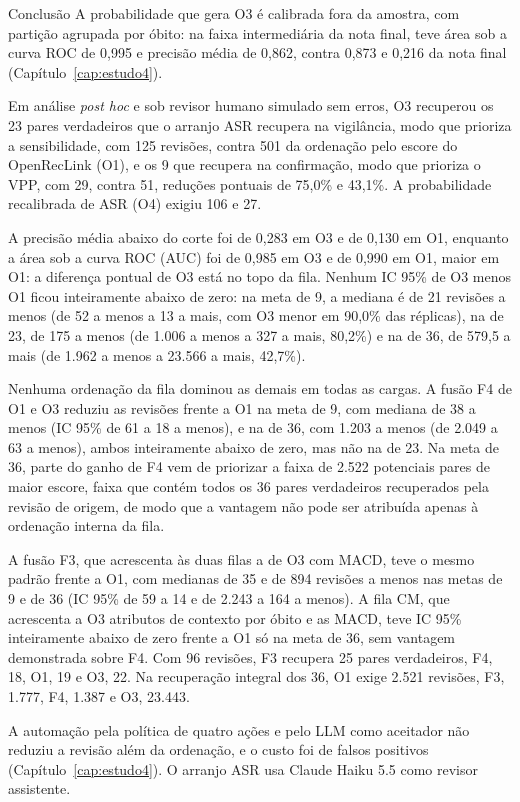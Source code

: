 \begin{chapter}{Conclusão}
A probabilidade que gera O3 é calibrada fora da amostra, com partição agrupada por óbito: na faixa intermediária da nota final, teve área sob a curva ROC de 0,995 e precisão média de 0,862, contra 0,873 e 0,216 da nota final (Capítulo~\ref{cap:estudo4}).

Em análise \textit{post hoc} e sob revisor humano simulado sem erros, O3 recuperou os 23 pares verdadeiros que o arranjo ASR recupera na vigilância, modo que prioriza a sensibilidade, com 125 revisões, contra 501 da ordenação pelo escore do OpenRecLink (O1), e os 9 que recupera na confirmação, modo que prioriza o VPP, com 29, contra 51, reduções pontuais de 75,0\% e 43,1\%. A probabilidade recalibrada de ASR (O4) exigiu 106 e 27.

A precisão média abaixo do corte foi de 0,283 em O3 e de 0,130 em O1, enquanto a área sob a curva ROC (AUC) foi de 0,985 em O3 e de 0,990 em O1, maior em O1: a diferença pontual de O3 está no topo da fila. Nenhum IC 95\% de O3 menos O1 ficou inteiramente abaixo de zero: na meta de 9, a mediana é de 21 revisões a menos (de 52 a menos a 13 a mais, com O3 menor em 90,0\% das réplicas), na de 23, de 175 a menos (de 1.006 a menos a 327 a mais, 80,2\%) e na de 36, de 579,5 a mais (de 1.962 a menos a 23.566 a mais, 42,7\%).

Nenhuma ordenação da fila dominou as demais em todas as cargas. A fusão F4 de O1 e O3 reduziu as revisões frente a O1 na meta de 9, com mediana de 38 a menos (IC 95\% de 61 a 18 a menos), e na de 36, com 1.203 a menos (de 2.049 a 63 a menos), ambos inteiramente abaixo de zero, mas não na de 23. Na meta de 36, parte do ganho de F4 vem de priorizar a faixa de 2.522 potenciais pares de maior escore, faixa que contém todos os 36 pares verdadeiros recuperados pela revisão de origem, de modo que a vantagem não pode ser atribuída apenas à ordenação interna da fila.

A fusão F3, que acrescenta às duas filas a de O3 com MACD, teve o mesmo padrão frente a O1, com medianas de 35 e de 894 revisões a menos nas metas de 9 e de 36 (IC 95\% de 59 a 14 e de 2.243 a 164 a menos). A fila CM, que acrescenta a O3 atributos de contexto por óbito e as MACD, teve IC 95\% inteiramente abaixo de zero frente a O1 só na meta de 36, sem vantagem demonstrada sobre F4. Com 96 revisões, F3 recupera 25 pares verdadeiros, F4, 18, O1, 19 e O3, 22. Na recuperação integral dos 36, O1 exige 2.521 revisões, F3, 1.777, F4, 1.387 e O3, 23.443.

A automação pela política de quatro ações e pelo LLM como aceitador não reduziu a revisão além da ordenação, e o custo foi de falsos positivos (Capítulo~\ref{cap:estudo4}). O arranjo ASR usa Claude Haiku 5.5 como revisor assistente.


\end{chapter}
